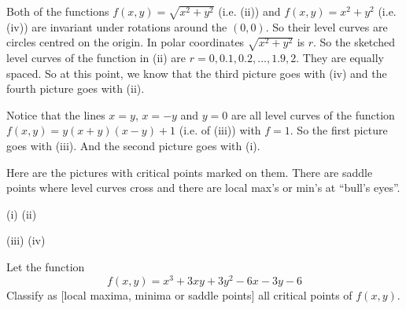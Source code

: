 \begin{solution}
Both of the functions  $f(x, y) = \sqrt{x^2 + y^2}$ (i.e. (ii))
and  $f(x, y) = x^2 + y^2$ (i.e. (iv)) are invariant under rotations
around the $(0,0)$. So their level curves are circles centred on 
the origin. In polar coordinates $\sqrt{x^2 + y^2}$ is $r$. 
So the sketched level curves of the function in (ii) are
$r = 0, 0.1, 0.2, \ldots , 1.9, 2$. They are equally spaced.
So at this point, we know that the third picture goes with (iv)
and the fourth picture goes with (ii).

Notice that the lines $x=y$, $x=-y$ and $y=0$ are all level curves
of the function $f(x, y) = y(x + y)(x - y) + 1$ (i.e. of (iii))
with $f=1$. So the first picture goes with (iii). And the second picture
goes with (i).

Here are the pictures with critical points marked on them.
There are saddle points where level curves cross and there
are local max's or min's at ``bull's eyes''.
\begin{center}
(i)   
\quad
(ii)  
\end{center}
\begin{center}
(iii)   
\quad
(iv)   
\end{center}
\end{solution}

\begin{question}[M200 2010D] %
Let the function
\begin{equation*}
f(x,y) = x^3+3xy+3y^2-6x-3y-6
\end{equation*}
Classify as $\big[$local maxima, minima or saddle points$\big]$
all critical points of $f(x,y)$.
\end{question}

%

